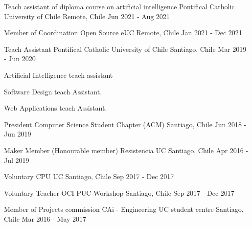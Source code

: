 

\begin{cventries}

\cventry
{Teach assistant of diploma course on artificial intelligence} %
{Pontifical Catholic University of Chile} %
{Remote, Chile} %
{Jun 2021 - Aug 2021} %
{}

\cventry
{Member of Coordination} %
{Open Source eUC} %
{Remote, Chile} %
{Jan 2021 - Dec 2021} %
{}

\cventry
{Teach Assistant} %
{Pontifical Catholic University of Chile} %
{Santiago, Chile} %
{Mar 2019 - Jun 2020} %
{
  \begin{cvitems} %
    \item {Artificial Intelligence teach assistant}
    \item {Software Design teach Assistant.}
    \item {Web Applications teach Assistant.}
  \end{cvitems}
}

\cventry
{President} %
{Computer Science Student Chapter (ACM)} %
{Santiago, Chile} %
{Jun 2018 - Jun 2019} %
{}


\cventry
{Maker Member (Honourable member)} %
{Resistencia UC} %
{Santiago, Chile} %
{Apr 2016 - Jul 2019} %
{}

\cventry
{Voluntary} %
{CPU UC} %
{Santiago, Chile} %
{Sep 2017 - Dec 2017} %
{}

\cventry
{Voluntary Teacher} %
{OCI PUC Workshop} %
{Santiago, Chile} %
{Sep 2017 - Dec 2017} %
{}

\cventry
{Member of Projects commission} %
{CAi - Engineering UC student centre} %
{Santiago, Chile} %
{Mar 2016 - May 2017} %
{}


\end{cventries}
